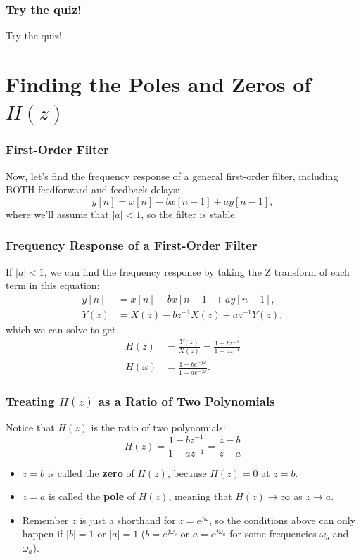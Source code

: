 \documentclass{beamer}
\begin{document}
\begin{frame}
  \centerline{}
\end{frame}

\begin{frame}
  \centerline{}
\end{frame}

\begin{frame}
  \frametitle{Try the quiz!}

  Try the quiz!
\end{frame}

\section[Poles and Zeros]{Finding the Poles and Zeros of $H(z)$}
\setcounter{subsection}{1}

\begin{frame}
  \frametitle{First-Order Filter}

  Now, let's find the frequency response of a general first-order filter, including BOTH
  feedforward and feedback delays:
  \[
  y[n] = x[n] - bx[n-1] + ay[n-1],
  \]
  where we'll assume that $|a|<1$, so the filter is stable.  
\end{frame}

\begin{frame}
  \frametitle{Frequency Response of a First-Order Filter}

  If $|a|<1$, we can find the frequency response by taking the Z transform of each
  term in this equation:
  \begin{align*}
    y[n] &= x[n] - bx[n-1] + ay[n-1],\\
    Y(z) &= X(z)-bz^{-1}X(z)+az^{-1} Y(z),
  \end{align*}
  which we can solve to get
  \begin{align*}
  H(z)  &= \frac{Y(z)}{X(z)} = \frac{1-bz^{-1}}{1-az^{-1}}\\
  H(\omega)  &= \frac{1-be^{-j\omega}}{1-ae^{-j\omega}}.
  \end{align*}
\end{frame}

\begin{frame}
  \frametitle{Treating $H(z)$ as a Ratio of Two Polynomials}

  Notice that $H(z)$ is the ratio of two polynomials:
  \[
  H(z)=\frac{1-bz^{-1}}{1-az^{-1}}=\frac{z-b}{z-a}
  \]
  \begin{itemize}
  \item $z=b$ is called the {\bf zero} of $H(z)$, because $H(z)=0$ at
    $z=b$.
  \item $z=a$ is called the {\bf pole} of $H(z)$, meaning that
    $H(z)\rightarrow\infty$ as $z\rightarrow a$.
  \item Remember $z$ is just a shorthand for $z=e^{j\omega}$, so the
    conditions above can only happen if $|b|=1$ or $|a|=1$
    ($b=e^{j\omega_b}$ or $a=e^{j\omega_a}$ for some frequencies
    $\omega_b$ and $\omega_a$).
  \end{itemize}
\end{frame}
\end{document}
